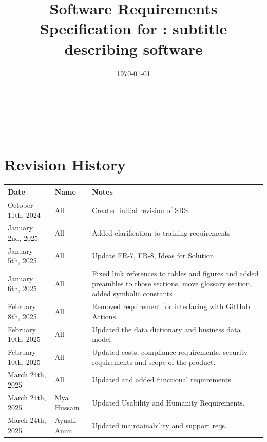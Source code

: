 \documentclass[12pt]{article}
\begin{document}

\title{Software Requirements Specification for \progname: subtitle
describing software}
\author{\authname}
\date{\today}

\maketitle
\thispagestyle{empty}

~\newpage

\tableofcontents

~\newpage

\section*{Revision History}

\begin{tabularx}{\textwidth}{p{3.7cm}p{1.8cm}X}
  \toprule {\textbf{Date}} & {\textbf{Name}} & {\textbf{Notes}}\\
  \midrule
  October 11th, 2024 & All & Created initial revision of SRS\\
  January 2nd, 2025 & All & Added clarification to training requirements\\
  January 5th, 2025 & All & Update FR-7, FR-8, Ideas for Solution \\
  January 6th, 2025 & All & Fixed link references to tables and
  figures and added preambles to those sections, move glossary
  section, added symbolic constants\\
  February 8th, 2025 & All & Removed requirement for interfacing with
  GitHub Actions.\\
  February 10th, 2025 & All & Updated the data dictionary and
  business data model \\
  February 10th, 2025 & All & Updated costs, compliance requirements,
  security requirements and scope of the product. \\
  March 24th, 2025 & All & Updated and added functional requirements. \\
  March 24th, 2025 & Mya Hussain & Updated Usability and Humanity Requirements. \\
  March 24th, 2025 & Ayushi Amin & Updated maintainability and support reqs. \\
  \bottomrule 
\end{tabularx}

~\\

~\newpage
\end{document}
